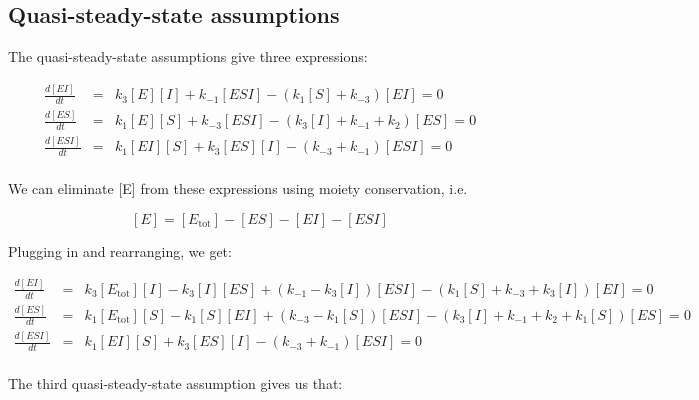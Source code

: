 \documentclass{article}
\begin{document}
\subsection*{Quasi-steady-state assumptions}

The quasi-steady-state assumptions give three expressions:

\begin{eqnarray*}
\frac{d\left[ EI \right]}{dt} & = & k_{3} \left[ E\right] \left[ I\right]  + k_{-1} \left[ ESI \right] - \left( k_1 \left[ S \right] + k_{-3} \right) \left[ EI \right] = 0 \\
\frac{d\left[ ES \right]}{dt} & = & k_{1} \left[ E\right] \left[ S \right]  + k_{-3} \left[ ESI \right] - \left( k_3 \left[ I \right] + k_{-1} + k_2 \right) \left[ ES \right] = 0\\
\frac{d\left[ ESI \right]}{dt} & = & k_{1} \left[ EI \right] \left[ S \right]  + k_{3} \left[ ES \right] \left[ I \right] - \left( k_{-3} + k_{-1} \right) \left[ ESI \right] = 0 \\
\end{eqnarray*}


We can eliminate [E] from these expressions using moiety conservation, i.e.

\[ \left[ E \right] = \left[ E_{\textrm{tot}} \right] - \left[ ES \right] - \left[ EI \right] - \left[ ESI \right] \]

Plugging in and rearranging, we get:

\begin{eqnarray*}
\frac{d\left[ EI \right]}{dt} & = & k_{3} \left[ E_{\textrm{tot}} \right] \left[ I\right]  - k_{3} \left[ I\right]  \left[ ES \right]  + \left(k_{-1} - k_3 \left[ I \right] \right) \left[ ESI \right] - \left( k_1 \left[ S \right] + k_{-3} + k_3 \left[ I \right] \right) \left[ EI \right] = 0 \\
\frac{d\left[ ES \right]}{dt} & = & k_{1} \left[ E_{\textrm{tot}} \right] \left[ S \right]  - k_{1} \left[ S \right] \left[ EI \right]  + \left( k_{-3} - k_1 \left[S\right] \right) \left[ ESI \right] - \left( k_3 \left[ I \right] + k_{-1} + k_2 + k_1 \left[S\right] \right) \left[ ES \right] = 0\\
\frac{d\left[ ESI \right]}{dt} & = & k_{1} \left[ EI \right] \left[ S \right]  + k_{3} \left[ ES \right] \left[ I \right] - \left( k_{-3} + k_{-1} \right) \left[ ESI \right] = 0 \\
\end{eqnarray*}

The third quasi-steady-state assumption gives us that:
\end{document}
